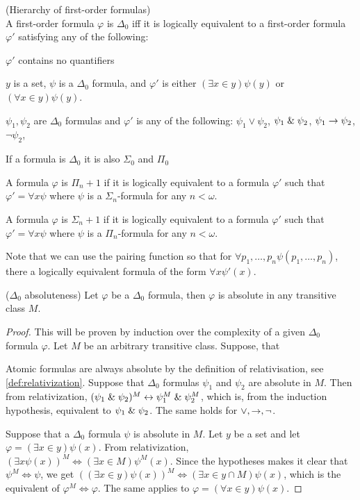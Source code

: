 \begin{definition}{(Hierarchy of first-order formulas)}\\
\bce[(I)]
A first-order formula $\varphi$ is $\Delta_0$ iff it is logically equivalent to a first-order formula $\varphi'$ satisfying any of the following:
\bce[(i)]
\item $\varphi'$ contains no quantifiers
\item $y$ is a set, $\psi$ is a $\Delta_0$ formula, and $\varphi'$ is either $(\exists x \in y)\psi(y)$ or $(\forall x \in y)\psi(y)$.
\item $\psi_1, \psi_2$ are $\Delta_0$ formulas and $\varphi'$ is any of the following: $\psi_1 \lor \psi_2$, $\psi_1 \mathrel{\&} \psi_2$, $\psi_1 \rightarrow \psi_2$, $\neg \psi_2$, 
\ece
\item If a formula is $\Delta_0$ it is also $\Sigma_0$ and $\Pi_0$
\item A formula $\varphi$ is $\Pi_n+1$ if it is logically equivalent to a formula $\varphi'$ such that $\varphi' = \forall x \psi$ where $\psi$ is a $\Sigma_n$-formula for any $n < \omega$.
\item A formula $\varphi$ is $\Sigma_n+1$ if it is logically equivalent to a formula $\varphi'$ such that $\varphi' = \forall x \psi$ where $\psi$ is a $\Pi_n$-formula for any $n < \omega$.
\ece
\end{definition}
Note that we can use the pairing function so that for $\forall p_1, \ldots, p_n \psi(p_1, \ldots, p_n)$, there a logically equivalent formula of the form $\forall x \psi'(x)$.

\begin{lemma}{($\Delta_0$ absoluteness)}\label{lemma:delta_0_abssoluteness}
Let $\varphi$ be a $\Delta_0$ formula, then $\varphi$ is absolute in any transitive class $M$.
\end{lemma}

\begin{proof}
This will be proven by induction over the complexity of a given $\Delta_0$ formula $\varphi$. Let $M$ be an arbitrary transitive class. Suppose, that 

Atomic formulas are always absolute by the definition of relativisation, see \ref{def:relativization}.
Suppose that $\Delta_0$ formulas $\psi_1$ and $\psi_2$ are absolute in $M$. Then from relativization, $(\psi_1 \mathrel{\&} \psi_2)^M \leftrightarrow \psi_1^M \mathrel{\&} \psi_2^M$, which is, from the induction hypothesis, equivalent to $\psi_1 \mathrel{\&} \psi_2$. The same holds for $\lor, \rightarrow, \neg$.

Suppose that a $\Delta_0$ formula $\psi$ is absolute in $M$. Let $y$ be a set and let $\varphi = (\exists x \in y) \psi(x)$. 
From relativization, $(\exists x \psi(x))^M \iff (\exists x \in M) \psi^M(x)$. Since the hypotheses makes it clear that $\psi^M \iff \psi$, we get $((\exists x \in y) \psi(x))^M \iff (\exists x \in y\cap M) \psi(x)$, which is the equivalent of $\varphi^M \iff \varphi$. The same applies to $\varphi = (\forall x \in y) \psi(x)$.
\end{proof}

